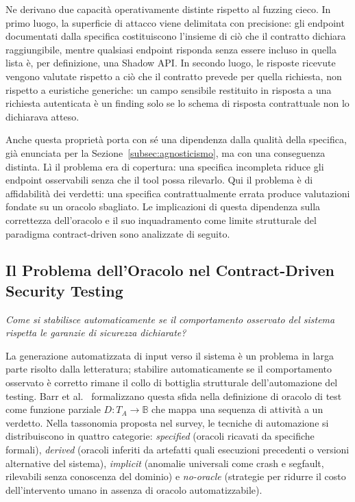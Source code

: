 Ne derivano due capacità operativamente distinte rispetto al fuzzing cieco. In primo luogo, la superficie di attacco viene delimitata con precisione: gli endpoint documentati dalla specifica costituiscono l'insieme di ciò che il contratto dichiara raggiungibile, mentre qualsiasi endpoint risponda senza essere incluso in quella lista è, per definizione, una Shadow API. In secondo luogo, le risposte ricevute vengono valutate rispetto a ciò che il contratto prevede per quella richiesta, non rispetto a euristiche generiche: un campo sensibile restituito in risposta a una richiesta autenticata è un finding solo se lo schema di risposta contrattuale non lo dichiarava atteso.


Anche questa proprietà porta con sé una dipendenza dalla qualità della specifica, già enunciata per la Sezione~\ref{subsec:agnosticismo}, ma con una conseguenza distinta. Lì il problema era di copertura: una specifica incompleta riduce gli endpoint osservabili senza che il tool possa rilevarlo. Qui il problema è di affidabilità dei verdetti: una specifica contrattualmente errata produce valutazioni fondate su un oracolo sbagliato. Le implicazioni di questa dipendenza sulla correttezza dell'oracolo e il suo inquadramento come limite strutturale del paradigma contract-driven sono analizzate di seguito.


\subsection{Il Problema dell'Oracolo nel Contract-Driven Security Testing}%
\label{subsec:oracle-design}

\textit{Come si stabilisce automaticamente se il comportamento osservato del sistema rispetta le garanzie di sicurezza dichiarate?}

La generazione automatizzata di input verso il sistema è un problema in larga parte risolto dalla letteratura; stabilire automaticamente se il comportamento osservato è corretto rimane il collo di bottiglia strutturale dell'automazione del testing. Barr et al.~\cite{barrOracleProblemSoftware2015} formalizzano questa sfida nella definizione di oracolo di test come funzione parziale \(D: T_A \to \mathbb{B}\) che mappa una sequenza di attività a un verdetto. Nella tassonomia proposta nel survey, le tecniche di automazione si distribuiscono in quattro categorie: \emph{specified} (oracoli ricavati da specifiche formali), \emph{derived} (oracoli inferiti da artefatti quali esecuzioni precedenti o versioni alternative del sistema), \emph{implicit} (anomalie universali come crash e segfault, rilevabili senza conoscenza del dominio) e \emph{no-oracle} (strategie per ridurre il costo dell'intervento umano in assenza di oracolo automatizzabile).



